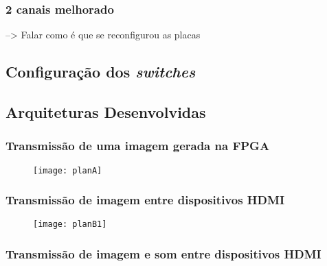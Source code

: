 \subsubsection{2 canais melhorado} \label{subsubsec:HDMIconfigMelhorado}

--> Falar como é que se reconfigurou as placas

\subsection{Configuração dos \textit{switches}}

\subsection{Arquiteturas Desenvolvidas} \label{subsec:HDMIarquiteturas}

\subsubsection{Transmissão de uma imagem gerada na FPGA}

		\begin{figure}[h!]
	\begin{center}
		\leavevmode
		\texttt{[image: planA]}
		\caption{}
		\label{fig:planA}
	\end{center}
\end{figure}

\subsubsection{Transmissão de imagem entre dispositivos HDMI}

		\begin{figure}[h!]
	\begin{center}
		\leavevmode
		\texttt{[image: planB1]}
		\caption{}
		\label{fig:planb1}
	\end{center}
\end{figure}

\subsubsection{Transmissão de imagem e som entre dispositivos HDMI}